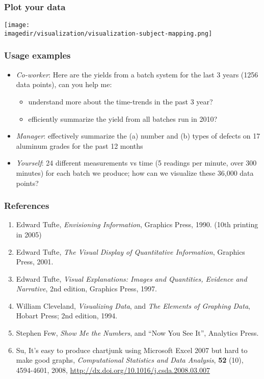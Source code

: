 \begin{frame}\frametitle{Plot your data}
	\begin{center}
		\texttt{[image: \\imagedir/visualization/visualization-subject-mapping.png]}
	\end{center}
\end{frame}

\begin{frame}\frametitle{Usage examples}
	\begin{itemize}
		\item	\emph{Co-worker}: Here are the yields from a batch system for the last 3 years (1256 data points), can you help me: 
		\begin{itemize}
			\item	understand more about the time-trends in the past 3 year? 
			\item	efficiently summarize the yield from all batches run in 2010? \pause 
		\end{itemize}
		\item	\emph{Manager}: effectively summarize the (a) number and (b) types of defects on 17 aluminum grades for the past 12 months \pause 
		\item	\emph{Yourself}: 24 different measurements vs time (5 readings per minute, over 300 minutes) for each batch we produce; how can we visualize these 36,000 data points? 
	\end{itemize}
\end{frame}

\begin{frame}\frametitle{References}
	\begin{enumerate}
		\item	Edward Tufte, \emph{Envisioning Information}, Graphics Press, 1990. (10th printing in 2005) 
		\item	Edward Tufte, \emph{The Visual Display of Quantitative Information}, Graphics Press, 2001. 
		\item	Edward Tufte, \emph{Visual Explanations: Images and Quantities, Evidence and Narrative}, 2nd edition, Graphics Press, 1997. 
		\item	William Cleveland, \emph{Visualizing Data}, and \emph{The Elements of Graphing Data}, Hobart Press; 2nd edition, 1994. 
		\item	Stephen Few, \emph{Show Me the Numbers}, and ``Now You See It'', Analytics Press. 
		\item	Su, It's easy to produce chartjunk using Microsoft Excel 2007 but hard to make good graphs, \emph{Computational Statistics and Data Analysis}, \textbf{52} (10), 4594-4601, 2008, \href{http://dx.doi.org/10.1016/j.csda.2008.03.007}{http://dx.doi.org/10.1016/j.csda.2008.03.007} 
	\end{enumerate}
\end{frame}


